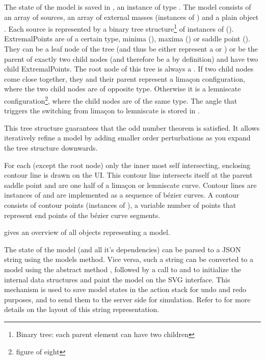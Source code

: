 The state of the model is saved in , an instance of type .
The model  consists of an array of sources, an array of external masses (instances of ) and a plain object .
Each source is represented by a binary tree structure\footnote{Binary tree: each parent element can have two children} of instances of  ().
ExtremalPoints are of a certain type, minima (), maxima () or saddle point ().
They can be a leaf node of the tree (and thus be either represent a  or ) or be the parent of exactly two child nodes (and therefore be a  by definition) and have two child ExtremalPoints.
The root node of this tree is always a .
If two child nodes come close together, they and their parent represent a limaçon configuration, where the two child nodes are of opposite type.
Otherwise it is a lemniscate configuration\footnote{figure of eight}, where the child nodes are of the same type.
The angle that triggers the switching from limaçon to lemniscate is stored in .

This tree structure guarantees that the odd number theorem is satisfied.
It allows iteratively refine a model by adding smaller order perturbations as you expand the tree structure downwards.


For each  (except the root node) only the inner most self intersecting, enclosing contour line is drawn on the UI.
This contour line intersects itself at the parent saddle point and are one half of a limaçon or lemniscate curve.
Contour lines are instances of  and are implemented as a sequence of bézier curves.
A contour consists of contour points (instances of ), a variable number of points that represent end points of the bézier curve segments.

 gives an overview of all objects representing a model.

The state of the model (and all it's dependencies) can be parsed to a JSON string using the models  method.
Vice versa, such a string can be converted to a model using the abstract method , followed by a call to  and  to initialize the internal data structures and paint the model on the SVG interface.
This mechanism is used to save model states in the action stack for undo and redo purposes, and to send them to the server side for simulation.
Refer to  for more details on the layout of this string representation.


